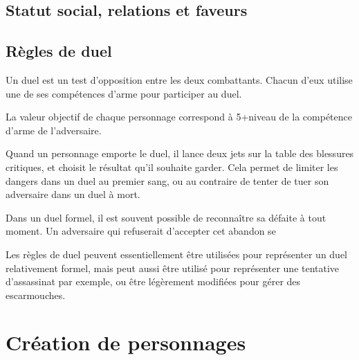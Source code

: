 \documentclass[10pt,a4paper]{book}
\begin{document}
\begin{multicols}{2}
\section{Statut social, relations et faveurs}
\section{Règles de duel}
Un duel est un test d'opposition entre les deux combattants. Chacun d'eux utilise une de ses compétences d'arme pour participer au duel. 

La valeur objectif de chaque personnage correspond à 5+niveau de la compétence d'arme de l'adversaire.

Quand un personnage emporte le duel, il lance deux jets sur la table des blessures critiques, et choisit le résultat qu'il souhaite garder. Cela permet de limiter les dangers dans un duel au premier sang, ou au contraire de tenter de tuer son adversaire dans un duel à mort.

Dans un duel formel, il est souvent possible de reconnaître sa défaite à tout moment. Un adversaire  qui refuserait d'accepter cet abandon se 

Les règles de duel peuvent essentiellement être utilisées pour représenter un duel relativement formel, mais peut aussi être utilisé pour représenter une tentative d'assassinat par exemple, ou être légèrement modifiées pour gérer des escarmouches.
\end{multicols}
\chapter{Création de personnages}
\begin{multicols}{2}
\end{multicols}
\end{document}
